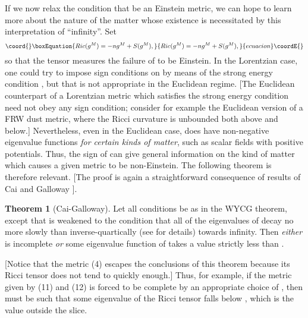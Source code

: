 \documentclass[a4paper,12pt]{article}
\theoremstyle{definition}
\newtheorem{thm}{Theorem}
\renewcommand{\u}{\textit}
\renewcommand{\-}{\myHighlight{$\dfrac{\quad\enspace}{\quad}$}\coordHE{}}
\begin{document}
If we now relax the condition that \coordHE{} be an Einstein metric, we can hope to learn
more about the nature of the matter whose existence is necessitated by this interpretation
of ``infinity''. Set 
\begin{equation}\coord{}\boxEquation{
Ric(g^M)=-ng^M+S(g^M),
}{
Ric(g^M)=-ng^M+S(g^M),
}{ecuacion}\coordE{}\end{equation}
so that the tensor \coordHE{} measures the failure of \coordHE{} to be Einstein. In the Lorentzian case,
one could try to impose sign conditions on \coordHE{} by means of the strong energy condition
\cite{10}, but that is not appropriate in the Euclidean regime. [The Euclidean counterpart
of a Lorentzian metric which satisfies the strong energy condition need not obey any sign
condition; consider for example the Euclidean version of a FRW dust metric, where the
Ricci curvature is unbounded both above and below.] Nevertheless, even in the Euclidean
case, \coordHE{} does have non-negative eigenvalue functions \u{for certain kinds of matter}, 
such as scalar fields with positive potentials. Thus, the sign of \coordHE{} can give general
information on the kind of matter which causes a given metric to be non-Einstein. The
following theorem is therefore relevant. [The proof is again a straightforward consequence 
of results of Cai and Galloway \cite{5}].
\begin{thm}[Cai-Galloway]
Let all conditions be as in the WYCG theorem, except that \coordHE{} is weakened to the condition that all of the eigenvalues of \coordHE{} decay no more slowly than inverse-quartically (see \cite{5} for details) towards infinity. Then \u{either} \coordHE{} is incomplete \u{or} some eigenvalue function of \coordHE{} takes a value strictly less than \coordHE{}.
\end{thm}
[Notice that the metric (4) escapes the conclusions of this theorem because its Ricci
tensor does not tend to \coordHE{} quickly enough.] Thus, for example, if the metric given by
(11) and (12) is forced to be complete by an appropriate choice of \coordHE{}, then
\coordHE{} must be such that some eigenvalue of the Ricci tensor falls below \coordHE{}, which
is the value outside the slice.
\end{document}
